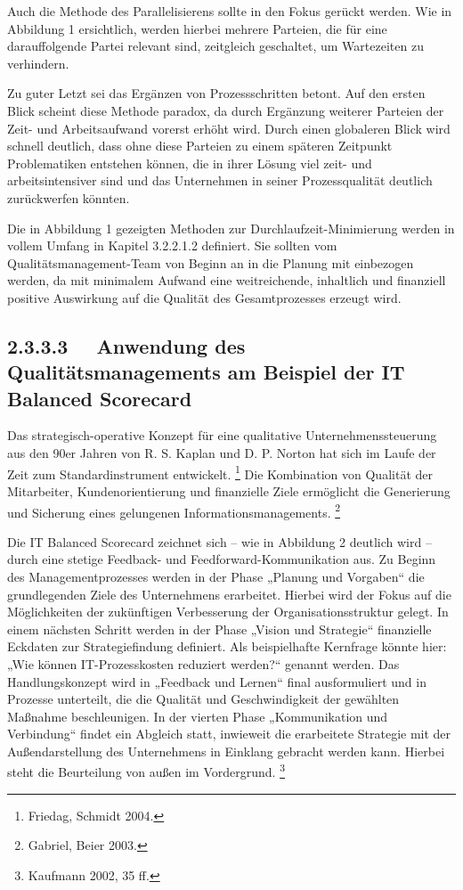 \documentclass{article}
\begin{document}
Auch die Methode des Parallelisierens sollte in den Fokus gerückt werden. Wie in Abbildung 1 ersichtlich, werden hierbei
mehrere Parteien, die für eine darauffolgende Partei relevant sind, zeitgleich geschaltet, um Wartezeiten zu
verhindern. 


\bigskip

Zu guter Letzt sei das Ergänzen von Prozessschritten betont. Auf den ersten Blick scheint diese Methode paradox, da
durch Ergänzung weiterer Parteien der Zeit- und Arbeitsaufwand vorerst erhöht wird. Durch einen globaleren Blick wird
schnell deutlich, dass ohne diese Parteien zu einem späteren Zeitpunkt Problematiken entstehen können, die in ihrer
Lösung viel zeit- und arbeitsintensiver sind und das Unternehmen in seiner Prozessqualität deutlich zurückwerfen
könnten.


\bigskip

Die in Abbildung 1 gezeigten Methoden zur Durchlaufzeit-Minimierung werden in vollem Umfang in Kapitel 3.2.2.1.2
definiert. Sie sollten vom Qualitätsmanagement-Team von Beginn an in die Planung mit einbezogen werden, da mit
minimalem Aufwand eine weitreichende, inhaltlich und finanziell positive Auswirkung auf die Qualität des
Gesamtprozesses erzeugt wird. 

\subsection[2.3.3.3 \ \ Anwendung des Qualitätsmanagements am Beispiel der IT Balanced Scorecard]{2.3.3.3 \ \ Anwendung
des Qualitätsmanagements am Beispiel der IT Balanced Scorecard}
Das strategisch-operative Konzept für eine qualitative Unternehmenssteuerung aus den 90er Jahren von R. S. Kaplan und D.
P. Norton hat sich im Laufe der Zeit zum Standardinstrument entwickelt. \footnote{Friedag, Schmidt 2004.} Die
Kombination von Qualität der Mitarbeiter, Kundenorientierung und finanzielle Ziele ermöglicht die Generierung und
Sicherung eines gelungenen Informationsmanagements. \footnote{Gabriel, Beier 2003.} 


\bigskip


\bigskip

Die IT Balanced Scorecard zeichnet sich – wie in Abbildung 2 deutlich wird – durch eine stetige Feedback- und
Feedforward-Kommunikation aus. Zu Beginn des Managementprozesses werden in der Phase „Planung und Vorgaben“ die
grundlegenden Ziele des Unternehmens erarbeitet. Hierbei wird der Fokus auf die Möglichkeiten der zukünftigen
Verbesserung der Organisationsstruktur gelegt. In einem nächsten Schritt werden in der Phase „Vision und Strategie“
finanzielle Eckdaten zur Strategiefindung definiert. Als beispielhafte Kernfrage könnte hier: „Wie können
IT-Prozesskosten reduziert werden?“ genannt werden. Das Handlungskonzept wird in „Feedback und Lernen“ final
ausformuliert und in Prozesse unterteilt, die die Qualität und Geschwindigkeit der gewählten Maßnahme beschleunigen. In
der vierten Phase „Kommunikation und Verbindung“ findet ein Abgleich statt, inwieweit die erarbeitete Strategie mit der
Außendarstellung des Unternehmens in Einklang gebracht werden kann. Hierbei steht die Beurteilung von außen im
Vordergrund. \footnote{Kaufmann 2002, 35 ff.}
\end{document}

